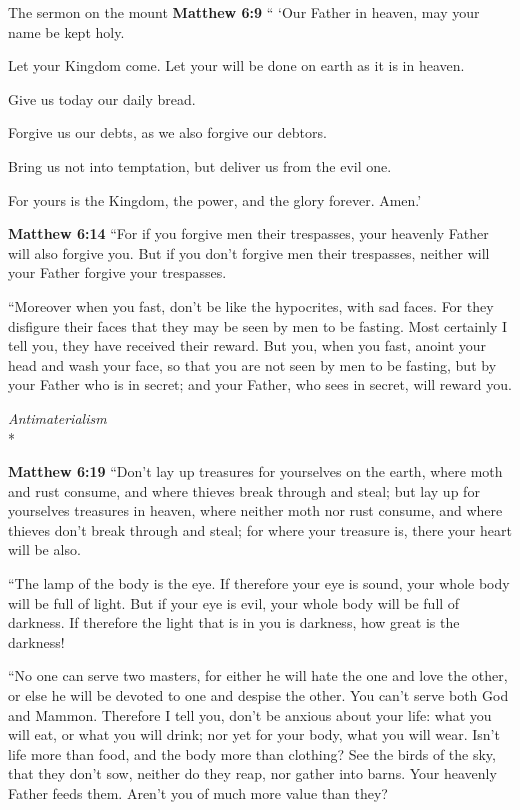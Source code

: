 \documentclass[10pt,twoside]{article} %
\newcommand{\doimage}[2]{\texttt{[image: \#2]}\label{fig:#2}}
\newcommand{\figbasic}[4]{ %
    \ifthenelse{\isodd{\pageref{fig:#2}}}{}{\hfill}
    \ifstrempty{#3}{
      \doimage{#1}{#2}
    }{
      \makebox{\doimage{#1}{#2} \\ #3}
    }
    \ifthenelse{\isodd{\pageref{fig:#2}}}{\hfill}{}
    \par
}
\newcommand{\fig}[2][0.4]{
  \figbasic{#1}{#2}{}{}
}
\newcommand{\quotesize}{\normalsize{}}
\newenvironment{quotetext}{\begingroup\quotesize}{\endgroup}
\newcommand{\intex}[1]{\index[texts]{#1}}
\newcommand{\bible}[2]{\begin{quotetext}\textbf{#1}\intex{#1} #2\end{quotetext}}
\newcommand{\matthew}[2]{\bible{Matthew #1}{#2}}
\newcommand{\subhead}[1]{\emph{#1}\\*}
\begin{document}
\begin{section}{The sermon on the mount}
\matthew{6:9}{
`` `Our Father in heaven, may your name be kept holy.

   Let your Kingdom come.
Let your will be done on earth as it is in heaven.

   Give us today our daily bread.

   Forgive us our debts,
as we also forgive our debtors.

   Bring us not into temptation,
but deliver us from the evil one.

For yours is the Kingdom, the power, and the glory forever. Amen.'
}

\matthew{6:14}{
   ``For if you forgive men their trespasses, your heavenly Father will also forgive you.    But if you don't forgive men their trespasses, neither will your Father forgive your trespasses.

   ``Moreover when you fast, don't be like the hypocrites, with sad faces. For they disfigure their faces that they may be seen by men to be fasting. Most certainly I tell you, they have received their reward.    But you, when you fast, anoint your head and wash your face,    so that you are not seen by men to be fasting, but by your Father who is in secret; and your Father, who sees in secret, will reward you.}

\fig{mammon}

\subhead{Antimaterialism}

\matthew{6:19}{
   ``Don't lay up treasures for yourselves on the earth, where moth and rust consume, and where thieves break through and steal;    but lay up for yourselves treasures in heaven, where neither moth nor rust consume, and where thieves don't break through and steal;    for where your treasure is, there your heart will be also.

   ``The lamp of the body is the eye. If therefore your eye is sound, your whole body will be full of light.    But if your eye is evil, your whole body will be full of darkness. If therefore the light that is in you is darkness, how great is the darkness!

   ``No one can serve two masters, for either he will hate the one and love the other, or else he will be devoted to one and despise the other. You can't serve both God and Mammon.    Therefore I tell you, don't be anxious about your life: what you will eat, or what you will drink; nor yet for your body, what you will wear. Isn't life more than food, and the body more than clothing?    See the birds of the sky, that they don't sow, neither do they reap, nor gather into barns. Your heavenly Father feeds them. Aren't you of much more value than they?

}
\end{section}
\end{document}
